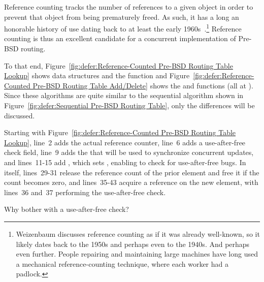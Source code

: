 Reference counting tracks the number of references to a given object in
order to prevent that object from being prematurely freed.
As such, it has a long an honorable history of use dating back to
at least the early
1960s~\cite{Weizenbaum:1963:SLP:367593.367617}.\footnote{
	Weizenbaum discusses reference counting as if it was already
	well-known, so it likely dates back to the 1950s and perhaps
	even to the 1940s.
	And perhaps even further.
	People repairing and maintaining large machines have long
	used a mechanical reference-counting technique, where each
	worker had a padlock.}
Reference counting is thus an excellent candidate for a concurrent
implementation of Pre-BSD routing.

To that end,
Figure~\ref{fig:defer:Reference-Counted Pre-BSD Routing Table Lookup}
shows data structures and the  function and
Figure~\ref{fig:defer:Reference-Counted Pre-BSD Routing Table Add/Delete}
shows the  and  functions
(all at ).
Since these algorithms are quite similar to the sequential algorithm
shown in
Figure~\ref{fig:defer:Sequential Pre-BSD Routing Table},
only the differences will be discussed.

Starting with
Figure~\ref{fig:defer:Reference-Counted Pre-BSD Routing Table Lookup},
line~2 adds the actual reference counter, line~6 adds a 
use-after-free check field, line~9 adds the  that will
be used to synchronize concurrent updates,
and lines~11-15 add , which sets
, enabling  to check for
use-after-free bugs.
In  itself, lines~29-31 release the reference
count of the prior element and free it if the count becomes zero,
and lines~35-43 acquire a reference on the new element, with lines~36
and~37 performing the use-after-free check.

\QuickQuiz{}
	Why bother with a use-after-free check?
 \QuickQuizEnd

